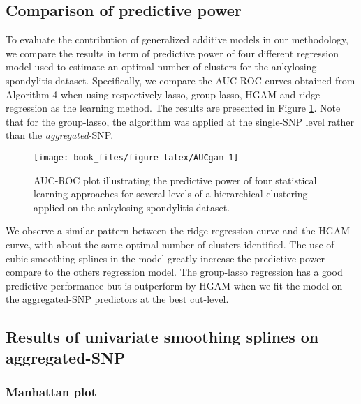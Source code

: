 \documentclass[]{book}
\begin{document}
\hypertarget{comparison-of-predictive-power}{%
\subsection{Comparison of predictive power}\label{comparison-of-predictive-power}}

To evaluate the contribution of generalized additive models in our
methodology, we compare the results in term of predictive power of four
different regression model used to estimate an optimal number of
clusters for the ankylosing spondylitis dataset. Specifically, we
compare the AUC-ROC curves obtained from Algorithm 4
when using respectively lasso, group-lasso, HGAM and ridge regression as
the learning method. The results are presented in Figure
\ref{fig:AUCgam}. Note that for the group-lasso, the algorithm was
applied at the single-SNP level rather than the \emph{aggregated}-SNP.



\begin{figure}

{\centering \texttt{[image: book\_files/figure-latex/AUCgam-1]} 

}

\caption{AUC-ROC plot illustrating the predictive power of four statistical learning approaches for several levels of a hierarchical clustering applied on the ankylosing spondylitis dataset.}\label{fig:AUCgam}
\end{figure}

We observe a similar pattern between the ridge regression curve and the
HGAM curve, with about the same optimal number of clusters identified.
The use of cubic smoothing splines in the model greatly increase the
predictive power compare to the others regression model. The group-lasso
regression has a good predictive performance but is outperform by HGAM
when we fit the model on the aggregated-SNP predictors at the best
cut-level.

\hypertarget{results-of-univariate-smoothing-splines-on-aggregated-snp}{%
\subsection{Results of univariate smoothing splines on aggregated-SNP}\label{results-of-univariate-smoothing-splines-on-aggregated-snp}}

\hypertarget{manhattan-plot}{%
\subsubsection{Manhattan plot}\label{manhattan-plot}}
\end{document}
